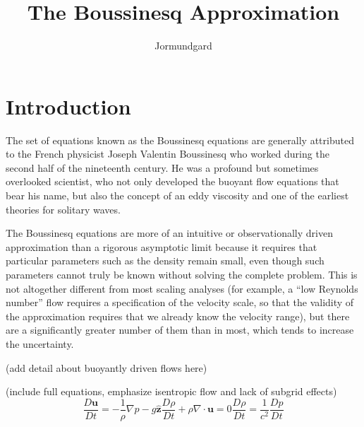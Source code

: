 \documentclass[letterpaper, 11pt]{article}
\title{The Boussinesq Approximation}
\author{Jormundgard}
\begin{document}
\maketitle


\section{Introduction}

The set of equations known as the Boussinesq equations are generally attributed to the French physicist Joseph Valentin Boussinesq who worked during the second half of the nineteenth century. He was a profound but sometimes overlooked scientist, who not only developed the buoyant flow equations that bear his name, but also the concept of an eddy viscosity and one of the earliest theories for solitary waves.

The Boussinesq equations are more of an intuitive or observationally driven approximation than a rigorous asymptotic limit because it requires that particular parameters such as the density remain small, even though such parameters cannot truly be known without solving the complete problem. This is not altogether different from most scaling analyses (for example, a ``low Reynolds number'' flow requires a specification of the velocity scale, so that the validity of the approximation requires that we already know the velocity range), but there are a significantly greater number of them than in most, which tends to increase the uncertainty.

(add detail about buoyantly driven flows here)

(include full equations, emphasize isentropic flow and lack of subgrid effects)
\begin{subequations}\label{FullEqns}
\begin{equation}\label{FullEqnMotion}
\frac{D \bm{u}}{D t} = -\frac{1}{\rho} \nabla p - g \hat{\bm{z}}
\end{equation}
\begin{equation}\label{FullMassEqn}
\frac{D \rho}{D t} + \rho \nabla \cdot \bm{u} = 0
\end{equation}
\begin{equation}\label{FullThermoEqn}
\frac{D \rho}{D t} = \frac{1}{c^2} \frac{D p}{D t}
\end{equation}
\end{subequations}
\end{document}

